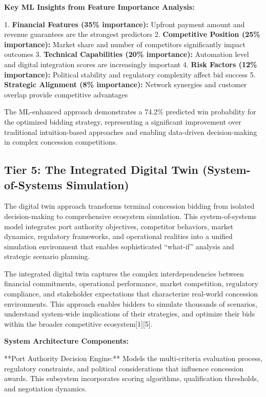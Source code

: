 \documentclass{article}
\begin{document}
\textbf{Key ML Insights from Feature Importance Analysis:}

1. \textbf{Financial Features (35\% importance):} Upfront payment amount and revenue guarantees are the strongest predictors
2. \textbf{Competitive Position (25\% importance):} Market share and number of competitors significantly impact outcomes
3. \textbf{Technical Capabilities (20\% importance):} Automation level and digital integration scores are increasingly important
4. \textbf{Risk Factors (12\% importance):} Political stability and regulatory complexity affect bid success
5. \textbf{Strategic Alignment (8\% importance):} Network synergies and customer overlap provide competitive advantages

The ML-enhanced approach demonstrates a 74.2\% predicted win probability for the optimized bidding strategy, representing a significant improvement over traditional intuition-based approaches and enabling data-driven decision-making in complex concession competitions.

\subsection{Tier 5: The Integrated Digital Twin (System-of-Systems Simulation)}

The digital twin approach transforms terminal concession bidding from isolated decision-making to comprehensive ecosystem simulation. This system-of-systems model integrates port authority objectives, competitor behaviors, market dynamics, regulatory frameworks, and operational realities into a unified simulation environment that enables sophisticated ``what-if'' analysis and strategic scenario planning.

The integrated digital twin captures the complex interdependencies between financial commitments, operational performance, market competition, regulatory compliance, and stakeholder expectations that characterize real-world concession environments. This approach enables bidders to simulate thousands of scenarios, understand system-wide implications of their strategies, and optimize their bids within the broader competitive ecosystem[1][5].

\textbf{System Architecture Components:}

**Port Authority Decision Engine:** Models the multi-criteria evaluation process, regulatory constraints, and political considerations that influence concession awards. This subsystem incorporates scoring algorithms, qualification thresholds, and negotiation dynamics.
\end{document}

